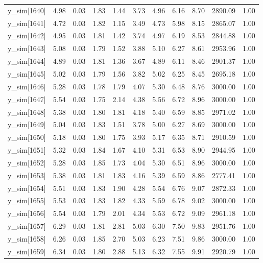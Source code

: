 \begin{table}[ht]
\begin{tabular}{rrrrrrrrrrr}
  y\_sim[1640] & 4.98 & 0.03 & 1.83 & 1.44 & 3.73 & 4.96 & 6.16 & 8.70 & 2890.09 & 1.00 \\ 
  y\_sim[1641] & 4.72 & 0.03 & 1.82 & 1.15 & 3.49 & 4.73 & 5.98 & 8.15 & 2865.07 & 1.00 \\ 
  y\_sim[1642] & 4.95 & 0.03 & 1.81 & 1.42 & 3.74 & 4.97 & 6.19 & 8.53 & 2844.88 & 1.00 \\ 
  y\_sim[1643] & 5.08 & 0.03 & 1.79 & 1.52 & 3.88 & 5.10 & 6.27 & 8.61 & 2953.96 & 1.00 \\ 
  y\_sim[1644] & 4.89 & 0.03 & 1.81 & 1.36 & 3.67 & 4.89 & 6.11 & 8.46 & 2901.37 & 1.00 \\ 
  y\_sim[1645] & 5.02 & 0.03 & 1.79 & 1.56 & 3.82 & 5.02 & 6.25 & 8.45 & 2695.18 & 1.00 \\ 
  y\_sim[1646] & 5.28 & 0.03 & 1.78 & 1.79 & 4.07 & 5.30 & 6.48 & 8.76 & 3000.00 & 1.00 \\ 
  y\_sim[1647] & 5.54 & 0.03 & 1.75 & 2.14 & 4.38 & 5.56 & 6.72 & 8.96 & 3000.00 & 1.00 \\ 
  y\_sim[1648] & 5.38 & 0.03 & 1.80 & 1.81 & 4.18 & 5.40 & 6.59 & 8.85 & 2971.02 & 1.00 \\ 
  y\_sim[1649] & 5.04 & 0.03 & 1.83 & 1.51 & 3.78 & 5.00 & 6.27 & 8.69 & 3000.00 & 1.00 \\ 
  y\_sim[1650] & 5.18 & 0.03 & 1.80 & 1.75 & 3.93 & 5.17 & 6.35 & 8.71 & 2910.59 & 1.00 \\ 
  y\_sim[1651] & 5.32 & 0.03 & 1.84 & 1.67 & 4.10 & 5.31 & 6.53 & 8.90 & 2944.95 & 1.00 \\ 
  y\_sim[1652] & 5.28 & 0.03 & 1.85 & 1.73 & 4.04 & 5.30 & 6.51 & 8.96 & 3000.00 & 1.00 \\ 
  y\_sim[1653] & 5.38 & 0.03 & 1.81 & 1.83 & 4.16 & 5.39 & 6.59 & 8.86 & 2777.41 & 1.00 \\ 
  y\_sim[1654] & 5.51 & 0.03 & 1.83 & 1.90 & 4.28 & 5.54 & 6.76 & 9.07 & 2872.33 & 1.00 \\ 
  y\_sim[1655] & 5.53 & 0.03 & 1.83 & 1.82 & 4.33 & 5.59 & 6.78 & 9.02 & 3000.00 & 1.00 \\ 
  y\_sim[1656] & 5.54 & 0.03 & 1.79 & 2.01 & 4.34 & 5.53 & 6.72 & 9.09 & 2961.18 & 1.00 \\ 
  y\_sim[1657] & 6.29 & 0.03 & 1.81 & 2.81 & 5.03 & 6.30 & 7.50 & 9.83 & 2951.76 & 1.00 \\ 
  y\_sim[1658] & 6.26 & 0.03 & 1.85 & 2.70 & 5.03 & 6.23 & 7.51 & 9.86 & 3000.00 & 1.00 \\ 
  y\_sim[1659] & 6.34 & 0.03 & 1.80 & 2.88 & 5.13 & 6.32 & 7.55 & 9.91 & 2920.79 & 1.00 \\ 

\end{tabular}
\end{table}
